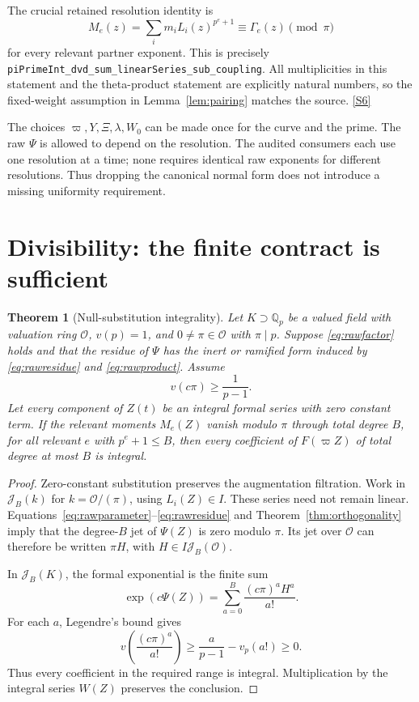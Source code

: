 \documentclass[11pt,letterpaper]{article}
\newtheorem{theorem}{Theorem}[section]
\theoremstyle{remark}
\newcommand{\OO}{\mathcal O}
\newcommand{\JJ}{\mathcal J}
\newcommand{\code}[1]{{\small\nolinkurl{#1}}}
\newcommand{\src}[1]{\hyperref[src:#1]{[S#1]}}
\begin{document}
The crucial retained resolution identity is
\begin{equation}
 M_e(z)=\sum_i m_i L_i(z)^{p^e+1}\equiv\Gamma_e(z)\pmod\pi
 \label{eq:resolution}
\end{equation}
for every relevant partner exponent. This is precisely
\code{piPrimeInt_dvd_sum_linearSeries_sub_coupling}. All multiplicities in this
statement and the theta-product statement are explicitly natural numbers, so the
fixed-weight assumption in Lemma~\ref{lem:pairing} matches the source. \src{6}

The choices \(\varpi,Y,\Xi,\lambda,W_0\) can be made once for the curve and
the prime. The raw \(\Psi\) is allowed to depend on the resolution. The audited
consumers each use one resolution at a time; none requires identical raw
exponents for different resolutions. Thus dropping the canonical normal form
does not introduce a missing uniformity requirement.

\section{Divisibility: the finite contract is sufficient}
\label{sec:upper}

\begin{theorem}[Null-substitution integrality]
\label{thm:integrality}
Let \(K\supset\mathbb Q_p\) be a valued field with valuation ring \(\OO\),
\(v(p)=1\), and \(0\ne\pi\in\OO\) with \(\pi\mid p\). Suppose
\eqref{eq:rawfactor} holds and that the residue of \(\Psi\) has the inert or
ramified form induced by \eqref{eq:rawresidue} and \eqref{eq:rawproduct}. Assume
\begin{equation}
 v(c\pi)\ge\frac1{p-1}. \label{eq:radius}
\end{equation}
Let every component of \(Z(t)\) be an integral formal series with zero constant
term. If the relevant moments \(M_e(Z)\) vanish modulo \(\pi\) through total
degree \(B\), for all relevant \(e\) with \(p^e+1\le B\), then every
coefficient of \(F(\varpi Z)\) of total degree at most \(B\) is integral.
\end{theorem}
\begin{proof}
Zero-constant substitution preserves the augmentation filtration. Work in
\(\JJ_B(k)\) for \(k=\OO/(\pi)\), using \(L_i(Z)\in I\). These series need
not remain linear. Equations~\eqref{eq:rawparameter}--\eqref{eq:rawresidue} and
Theorem~\ref{thm:orthogonality} imply that the degree-\(B\) jet of \(\Psi(Z)\)
is zero modulo \(\pi\). Its jet over \(\OO\) can therefore be written
\(\pi H\), with \(H\in I\JJ_B(\OO)\).

In \(\JJ_B(K)\), the formal exponential is the finite sum
\[
 \exp(c\Psi(Z))=\sum_{a=0}^{B}\frac{(c\pi)^a H^a}{a!}.
\]
For each \(a\), Legendre's bound gives
\[
 v\left(\frac{(c\pi)^a}{a!}\right)
 \ge\frac{a}{p-1}-v_p(a!)\ge0.
\]
Thus every coefficient in the required range is integral. Multiplication by the
integral series \(W(Z)\) preserves the conclusion.
\end{proof}
\end{document}
